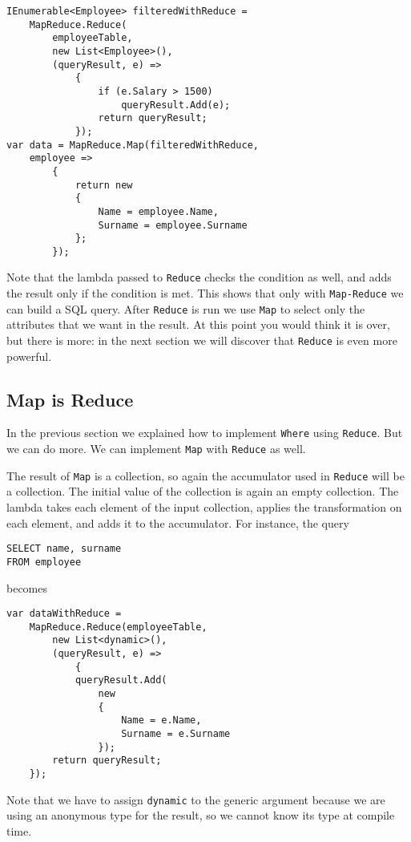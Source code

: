 \begin{lstlisting}
IEnumerable<Employee> filteredWithReduce =
	MapReduce.Reduce(
		employeeTable,
		new List<Employee>(),
		(queryResult, e) =>
			{
				if (e.Salary > 1500)
					queryResult.Add(e);
				return queryResult;
			});
var data = MapReduce.Map(filteredWithReduce,
	employee =>
		{
			return new
			{
				Name = employee.Name,
				Surname = employee.Surname
			};
		});
\end{lstlisting}

Note that the lambda passed to \texttt{Reduce} checks the condition as well, and adds the result only if the condition is met. This shows that only with \texttt{Map-Reduce} we can build a SQL query. After \texttt{Reduce} is run we use \texttt{Map} to select only the attributes that we want in the result. At this point you would think it is over, but there is more: in the next section we will discover that \texttt{Reduce} is even more powerful.

\subsection{Map is Reduce}
In the previous section we explained how to implement \texttt{Where} using \texttt{Reduce}. But we can do more. We can implement \texttt{Map} with \texttt{Reduce} as well.

The result of \texttt{Map} is a collection, so again the accumulator used in \texttt{Reduce} will be a collection. The initial value of the collection is again an empty collection. The lambda takes each element of the input collection, applies the transformation on each element, and adds it to the accumulator. For instance, the query

\begin{lstlisting}
SELECT name, surname
FROM employee
\end{lstlisting}

\noindent
becomes

\begin{lstlisting}
var dataWithReduce =
	MapReduce.Reduce(employeeTable,
		new List<dynamic>(),
		(queryResult, e) =>
			{
			queryResult.Add(
				new
				{
					Name = e.Name,
					Surname = e.Surname
				});
		return queryResult;
	});
\end{lstlisting}

Note that we have to assign \texttt{dynamic} to the generic argument because we are using an anonymous type for the result, so we cannot know its type at compile time.

